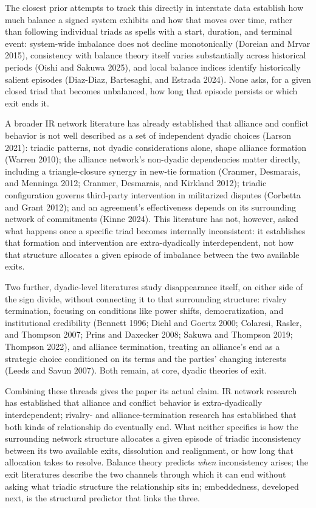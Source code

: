 \documentclass[Afour,sageh,times,doublespace]{sagej}
\begin{document}
The closest prior attempts to track this directly in interstate data establish how much balance a signed system exhibits and how that moves over time, rather than following individual triads as spells with a start, duration, and terminal event: system-wide imbalance does not decline monotonically (Doreian and Mrvar 2015), consistency with balance theory itself varies substantially across historical periods (Oishi and Sakuwa 2025), and local balance indices identify historically salient episodes (Diaz-Diaz, Bartesaghi, and Estrada 2024). None asks, for a given closed triad that becomes unbalanced, how long that episode persists or which exit ends it.

A broader IR network literature has already established that alliance and conflict behavior is not well described as a set of independent dyadic choices (Larson 2021): triadic patterns, not dyadic considerations alone, shape alliance formation (Warren 2010); the alliance network's non-dyadic dependencies matter directly, including a triangle-closure synergy in new-tie formation (Cranmer, Desmarais, and Menninga 2012; Cranmer, Desmarais, and Kirkland 2012); triadic configuration governs third-party intervention in militarized disputes (Corbetta and Grant 2012); and an agreement's effectiveness depends on its surrounding network of commitments (Kinne 2024). This literature has not, however, asked what happens once a specific triad becomes internally inconsistent: it establishes that formation and intervention are extra-dyadically interdependent, not how that structure allocates a given episode of imbalance between the two available exits.

Two further, dyadic-level literatures study disappearance itself, on either side of the sign divide, without connecting it to that surrounding structure: rivalry termination, focusing on conditions like power shifts, democratization, and institutional credibility (Bennett 1996; Diehl and Goertz 2000; Colaresi, Rasler, and Thompson 2007; Prins and Daxecker 2008; Sakuwa and Thompson 2019; Thompson 2022), and alliance termination, treating an alliance's end as a strategic choice conditioned on its terms and the parties' changing interests (Leeds and Savun 2007). Both remain, at core, dyadic theories of exit.

Combining these threads gives the paper its actual claim. IR network research has established that alliance and conflict behavior is extra-dyadically interdependent; rivalry- and alliance-termination research has established that both kinds of relationship do eventually end. What neither specifies is how the surrounding network structure allocates a given episode of triadic inconsistency between its two available exits, dissolution and realignment, or how long that allocation takes to resolve. Balance theory predicts \emph{when} inconsistency arises; the exit literatures describe the two channels through which it can end without asking what triadic structure the relationship sits in; embeddedness, developed next, is the structural predictor that links the three.
\end{document}
